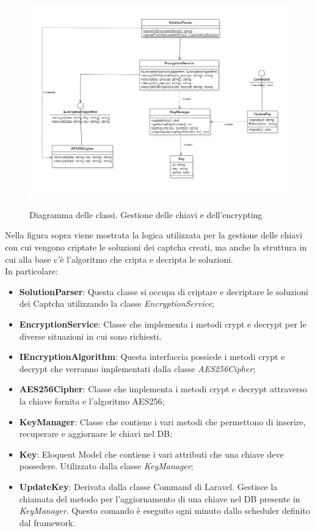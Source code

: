 \newpage


\begin{figure}[H]
	\centering
	\includegraphics[scale = 0.55]{img/key_manager.png}\\
	\caption{Diagramma delle classi. Gestione delle chiavi e dell'encrypting}
\end{figure}

Nella figura sopra viene mostrata la logica utilizzata per la gestione delle chiavi con cui vengono criptate le soluzioni dei captcha creati, ma anche la struttura in cui alla base c'è l'algoritmo che cripta e decripta le soluzioni.\\
In particolare:
\begin{itemize}
	\item \textbf{SolutionParser}: Questa classe si occupa di criptare e decriptare le soluzioni dei Captcha utilizzando la classe \textit{EncryptionService};
	\item \textbf{EncryptionService}: Classe che implementa i metodi crypt e decrypt per le diverse situazioni in cui sono richiesti.
	\item \textbf{IEncryptionAlgorithm}: Questa interfaccia possiede i metodi crypt e decrypt che verranno implementati dalla classe \textit{AES256Cipher}; 
	\item \textbf{AES256Cipher}: Classe che implementa i metodi crypt e decrypt attraverso la chiave fornita e l'algoritmo AES256;
	\item \textbf{KeyManager}: Classe che contiene i vari metodi che permettono di inserire, recuperare e aggiornare le chiavi nel DB;
	\item \textbf{Key}: Eloquent Model che contiene i vari attributi che una chiave deve possedere. Utilizzato dalla classe \textit{KeyManager};
	\item \textbf{UpdateKey}: Derivata dalla classe Command di Laravel. Gestisce la chiamata del metodo per l'aggiornamento di una chiave nel DB presente in \textit{KeyManager}. Questo comando è eseguito ogni minuto dallo scheduler definito dal framework.
\end{itemize}

